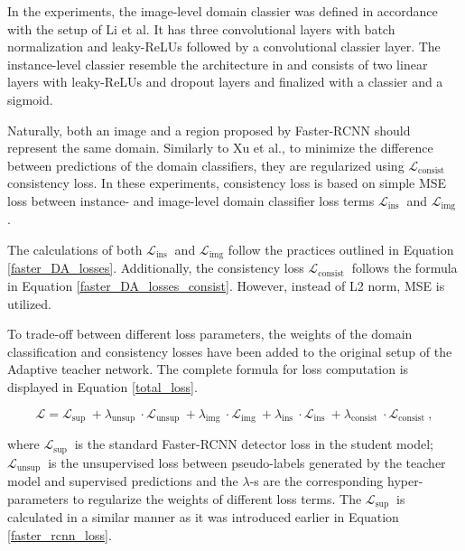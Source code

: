 \documentclass[english, 12pt, a4paper, elec, utf8, a-1b, online]{aaltothesis}
\begin{document}
In the experiments, the image-level domain classier was defined in accordance with the setup of Li et al. It has three convolutional layers with batch normalization and leaky-ReLUs followed by a convolutional classier layer. The instance-level classier resemble the architecture in \cite{Xu2020} and consists of two linear layers with leaky-ReLUs and dropout layers and finalized with a classier and a sigmoid. 

Naturally, both an image and a region proposed by Faster-RCNN should represent the same domain. Similarly to Xu et al., to minimize the difference between predictions of the domain classifiers, they are regularized using $\mathcal{L}_{\text {consist }}$ consistency loss. In these experiments, consistency loss is based on simple MSE loss between instance- and image-level domain classifier loss terms $\mathcal{L}_{\text {ins }}$ and $\mathcal{L}_{\text {img }}$.

The calculations of both $\mathcal{L}_{\text {ins }}$ and $\mathcal{L}_{\text {img}}$ follow the practices outlined in Equation \ref{faster_DA_losses}. Additionally,  the consistency loss $\mathcal{L}_{\text {consist }}$ follows the formula in Equation \ref{faster_DA_losses_consist}. However, instead of L2 norm, MSE is utilized.  

To trade-off between different loss parameters, the weights of the domain classification and consistency losses have been added to the original setup of the Adaptive teacher network. The complete formula for loss computation is displayed in Equation \ref{total_loss}. 

\begin{equation}
\mathcal{L}=\mathcal{L}_{\text {sup }}+\lambda_{\text {unsup }} \cdot \mathcal{L}_{\text {unsup }}+\lambda_{\text {img }} \cdot \mathcal{L}_{\text {img }}+\lambda_{\text {ins }} \cdot \mathcal{L}_{\text {ins }}+\lambda_{\text {consist }} \cdot \mathcal{L}_{\text {consist }},
\label{total_loss} 
\end{equation}

where $\mathcal{L}_{\text {sup }}$ is the standard Faster-RCNN detector loss in the student model; $\mathcal{L}_{\text {unsup }}$ is the unsupervised loss between pseudo-labels generated by the teacher model and supervised predictions and the $\lambda$-s are the corresponding hyper-parameters to regularize the weights of different loss terms. The $\mathcal{L}_{\text {sup }}$ is calculated in a similar manner as it was introduced earlier in Equation \ref{faster_rcnn_loss}. 
 
\end{document}
